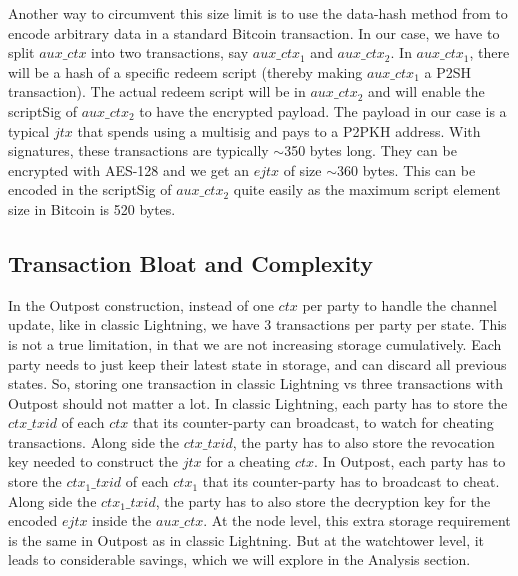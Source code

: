 Another way to circumvent this size limit is to use the data-hash method from \cite{sward2018data} to encode arbitrary data in a standard Bitcoin transaction. In our case, we have to split $\mathit{aux\_ctx}$ into two transactions, say $\mathit{aux\_ctx_1}$ and $\mathit{aux\_ctx_2}$. In $\mathit{aux\_ctx_1}$, there will be a hash of a specific redeem script (thereby making $\mathit{aux\_ctx_1}$ a P2SH transaction). The actual redeem script will be in $\mathit{aux\_ctx_2}$ and will enable the scriptSig of $\mathit{aux\_ctx_2}$ to have the encrypted payload. The payload in our case is a typical $\mathit{jtx}$ that spends using a multisig and pays to a P2PKH address. With signatures, these transactions are typically $\sim$350 bytes long. They can be encrypted with AES-128 and we get an $\mathit{ejtx}$ of size $\sim$360 bytes. This can be encoded in the scriptSig of $\mathit{aux\_ctx_2}$ quite easily as the maximum script element size in Bitcoin is 520 bytes.

\subsection{Transaction Bloat and Complexity}
In the Outpost construction, instead of one $\mathit{ctx}$ per party to handle the channel update, like in classic Lightning, we have 3 transactions per party per state. This is not a true limitation, in that we are not increasing storage cumulatively. Each party needs to just keep their latest state in storage, and can discard all previous states. So, storing one transaction in classic Lightning vs three transactions with Outpost should not matter a lot. In classic Lightning, each party has to store the $\mathit{ctx\_txid}$ of each $\mathit{ctx}$ that its counter-party can broadcast, to watch for cheating transactions. Along side the $\mathit{ctx\_txid}$, the party has to also store the revocation key needed to construct the $\mathit{jtx}$ for a cheating $\mathit{ctx}$. In Outpost, each party has to store the $\mathit{ctx_1\_txid}$ of each $\mathit{ctx_1}$ that its counter-party has to broadcast to cheat. Along side the $\mathit{ctx_1\_txid}$, the party has to also store the decryption key for the encoded $\mathit{ejtx}$ inside the $\mathit{aux\_ctx}$. At the node level, this extra storage requirement is the same in Outpost as in classic Lightning. But at the watchtower level, it leads to considerable savings, which we will explore in the Analysis section.

